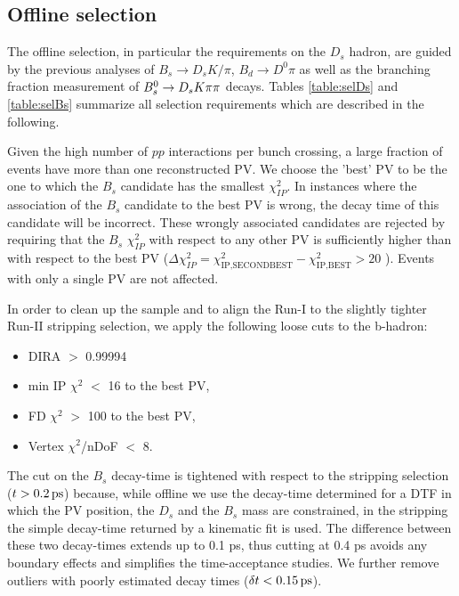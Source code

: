 \subsection{Offline selection}

The offline selection, in particular the requirements on the $D_s$ hadron, are guided by the previous analyses of 
$B_s \to D_s K/\pi$, $B_d \to D^0 \pi$ as well as the branching fraction measurement of ${{B}^0_{s}}\rightarrow{\ensuremath{{D}_{s}}}{\ensuremath{K}}{\ensuremath{\pi}}{\ensuremath{\pi}}$ decays.
Tables \ref{table:selDs} and \ref{table:selBs} summarize all selection requirements which are described in the following.

Given the high number of $pp$ interactions per bunch crossing, a large fraction
of events have more than one reconstructed PV. 
We choose the 'best' PV to be the one to which the 
$B_s$ candidate has the smallest $\chi^2_{IP}$.
In instances where the association of the $B_s$ candidate to the best PV is wrong,
the decay time of this candidate will be incorrect. 
These wrongly associated candidates
are rejected by requiring that the $B_s$ $\chi^2_{IP}$ with respect to any other PV is sufficiently higher than with respect to the best PV 
($\Delta \chi^2_{IP} = \chi^2_{\text{IP,SECONDBEST}} - \chi^2_{\text{IP,BEST}} > 20$ ).
Events with only a single PV are not affected.

In order to clean up the sample and to align the Run-I to the slightly tighter Run-II stripping selection, we apply the following loose cuts to the b-hadron:
\begin{itemize}
\item DIRA $>$ 0.99994
\item min IP $\chi^{2}$ $<$ 16 to the best PV,
\item FD $\chi^{2}$ $>$ 100 to the best PV,
\item Vertex $\chi^{2}$/nDoF $<$ 8.
\end{itemize}    
The cut on the $B_s$ decay-time is tightened with respect to the stripping selection ($t > 0.2 {\mathrm{ \,ps}}$) because, while offline we use the decay-time determined for a DTF in which the PV position, the $D_s$ and the $B_s$ mass are constrained, in the stripping the simple decay-time returned by a kinematic fit is used. 
The difference between these two decay-times extends up to 0.1 ps, thus cutting at 0.4 ps avoids any boundary effects and simplifies the time-acceptance studies.
We further remove outliers with poorly estimated decay times ($\delta t< 0.15 {\mathrm{ \,ps}}$).

